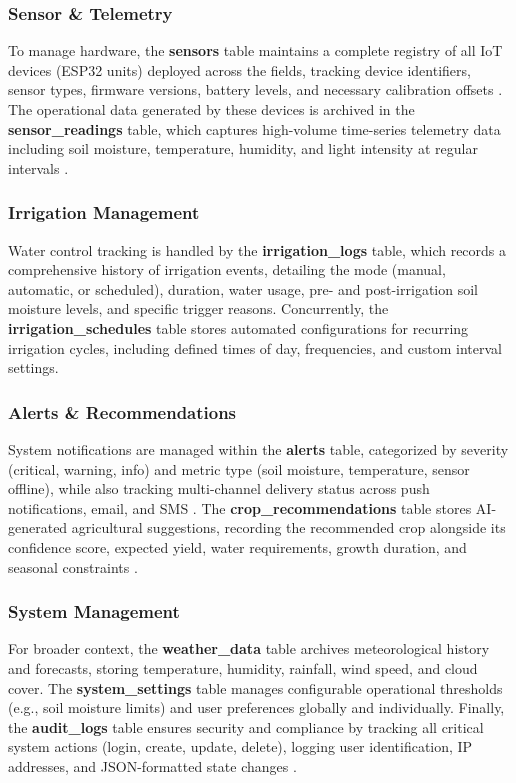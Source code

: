 \subsubsection{Sensor \& Telemetry}
To manage hardware, the \textbf{sensors} table maintains a complete registry of all IoT devices (ESP32 units) deployed across the fields, tracking device identifiers, sensor types, firmware versions, battery levels, and necessary calibration offsets \cite{farooq2019survey}. The operational data generated by these devices is archived in the \textbf{sensor\_readings} table, which captures high-volume time-series telemetry data including soil moisture, temperature, humidity, and light intensity at regular intervals \cite{ncbi2023iot}.

\subsubsection{Irrigation Management}
Water control tracking is handled by the \textbf{irrigation\_logs} table, which records a comprehensive history of irrigation events, detailing the mode (manual, automatic, or scheduled), duration, water usage, pre- and post-irrigation soil moisture levels, and specific trigger reasons. Concurrently, the \textbf{irrigation\_schedules} table stores automated configurations for recurring irrigation cycles, including defined times of day, frequencies, and custom interval settings.

\subsubsection{Alerts \& Recommendations}
System notifications are managed within the \textbf{alerts} table, categorized by severity (critical, warning, info) and metric type (soil moisture, temperature, sensor offline), while also tracking multi-channel delivery status across push notifications, email, and SMS \cite{khawas2018firebase}. The \textbf{crop\_recommendations} table stores AI-generated agricultural suggestions, recording the recommended crop alongside its confidence score, expected yield, water requirements, growth duration, and seasonal constraints \cite{ali2025soilml}.

\subsubsection{System Management}
For broader context, the \textbf{weather\_data} table archives meteorological history and forecasts, storing temperature, humidity, rainfall, wind speed, and cloud cover. The \textbf{system\_settings} table manages configurable operational thresholds (e.g., soil moisture limits) and user preferences globally and individually. Finally, the \textbf{audit\_logs} table ensures security and compliance by tracking all critical system actions (login, create, update, delete), logging user identification, IP addresses, and JSON-formatted state changes \cite{sommerville2016software}.

